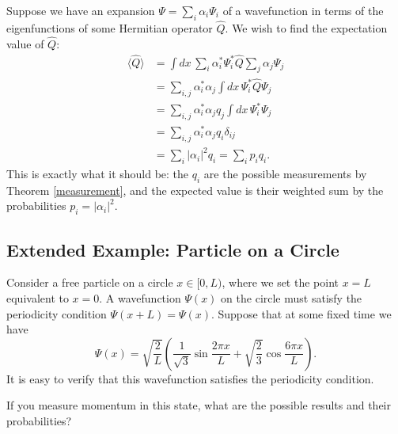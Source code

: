 Suppose we have an expansion $\Psi=\sum_i\alpha_i\Psi_i$ of a wavefunction in terms of the eigenfunctions of some Hermitian operator $\hat{Q}$. We wish to find the expectation value of $\hat{Q}$: \begin{align*}\langle\hat{Q}\rangle&=\int dx\,\sum_i\alpha_i^*\Psi_i^*\hat{Q}\sum_j\alpha_j\Psi_j\\&=\sum_{i,j}\alpha_i^*\alpha_j\int dx\,\Psi_i^*\hat{Q}\Psi_j\\&=\sum_{i,j}\alpha_i^*\alpha_jq_j\int dx\,\Psi_i^*\Psi_j\\&=\sum_{i,j}\alpha_i^*\alpha_jq_i\delta_{ij}\\&=\sum_i|\alpha_i|^2q_i=\sum_ip_iq_i.\end{align*}This is exactly what it should be: the $q_i$ are the possible measurements by Theorem \ref{measurement}, and the expected value is their weighted sum by the probabilities $p_i=|\alpha_i|^2$.

\subsection{Extended Example: Particle on a Circle}\label{particle-on-a-circle}

Consider a free particle on a circle $x\in [0,L)$, where we set the point $x=L$ equivalent to $x=0$. A wavefunction $\Psi(x)$ on the circle must satisfy the periodicity condition $\Psi(x+L)=\Psi(x)$. Suppose that at some fixed time we have $$\Psi(x)=\sqrt{\frac{2}{L}}(\frac{1}{\sqrt{3}}\sin\frac{2\pi x}{L}+\sqrt{\frac{2}{3}}\cos\frac{6\pi x}{L}).$$It is easy to verify that this wavefunction satisfies the periodicity condition.

\begin{framedquest*}
    If you measure momentum in this state, what are the possible results and their probabilities?
\end{framedquest*}

